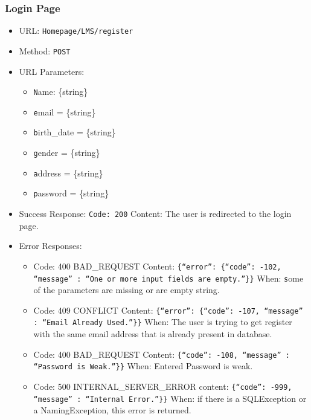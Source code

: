 \subsubsection*{Login Page}
\begin{itemize}
    \item URL: \texttt{Homepage/LMS/register}
    \item Method: \texttt{POST}
    \item URL Parameters:
    \begin{itemize}
        \item \texttt Name: \{string\}
        \item \texttt email = \{string\}
        \item \texttt birth\_date = \{string\}
        \item \texttt gender = \{string\}
        \item \texttt address = \{string\}
        \item \texttt password = \{string\}
    \end{itemize}
    \item Success Response: \texttt{Code: 200} \newline
    Content: The user is redirected to the login page.
    \item Error Responses:
    \begin{itemize}
        \item {Code: 400 BAD\_REQUEST} \newline
        Content: \texttt {\{“error”: \{“code”: -102, “message” : “One or more input fields are empty.”\}\}} \newline
        When: \texttt some of the parameters are missing or are empty string.

        \item {Code: 409 CONFLICT} \newline
        Content: \texttt {\{“error”: \{“code”: -107, “message” : “Email Already Used.”\}\}} \newline
        When: The user is trying to get register with the same email address that is already present in database.

        \item {Code: 400 BAD_REQUEST} \newline
        Content: \texttt {\{“code”: -108, “message” : “Password is Weak.”\}\}} \newline
        When: Entered Password is weak.

        \item {Code: 500 INTERNAL_SERVER_ERROR} \newline
        content: \texttt {\{“code”: -999, “message” : “Internal Error.”\}\}} \newline
        When: if there is a SQLException or a NamingException, this error is returned.
    \end{itemize}
\end{itemize}

